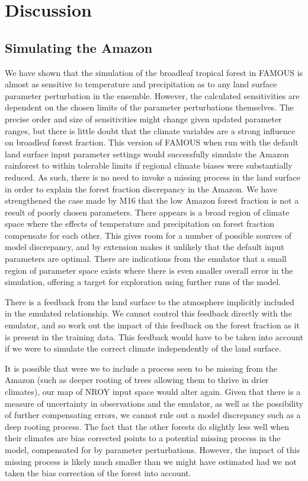 \documentclass[gmd, manuscript]{copernicus}
\begin{document}
\section{Discussion}\label{sec:discussion}
\subsection{Simulating the Amazon}\label{ssec:simulating}
We have shown that the simulation of the broadleaf tropical forest in FAMOUS is almost as sensitive to temperature and precipitation as to any land surface parameter perturbation in the ensemble. However, the calculated sensitivities are dependent on the chosen limits of the parameter perturbations themselves. The precise order and size of sensitivities might change given updated parameter ranges, but there is little doubt that the climate variables are a strong influence on broadleaf forest fraction. This version of FAMOUS when run with the default land surface input parameter settings would successfully simulate the Amazon rainforest to within tolerable limits if regional climate biases were substantially reduced. As such, there is no need to invoke a missing process in the land surface in order to explain the forest fraction discrepancy in the Amazon. We have strengthened the case made by M16 that the low Amazon forest fraction is not a result of poorly chosen parameters.  There appears is a broad region of climate space where the effects of temperature and precipitation on forest fraction compensate for each other. This gives room for a number of possible sources of model discrepancy, and by extension makes it unlikely that the default input parameters are optimal. There are indications from the emulator that a small region of parameter space exists where there is even smaller overall error in the simulation, offering a target for exploration using further runs of the model.
 
There is a feedback from the land surface to the atmosphere implicitly included in the emulated relationship. We cannot control this feedback directly with the emulator, and so work out the impact of this feedback on the forest fraction as it is present in the training data. This feedback would have to be taken into account if we were to simulate the correct climate independently of the land surface.

It is possible that were we to include a process seen to be missing from the Amazon (such as deeper rooting of trees allowing them to thrive in drier climates), our map of NROY input space would alter again. Given that there is a measure of uncertainty in observations and the emulator, as well as the possibility of further compensating errors, we cannot rule out a model discrepancy such as a deep rooting process. The fact that the other forests do slightly less well when their climates are bias corrected points to a potential missing process in the model, compensated for by parameter perturbations. However, the impact of this missing process is likely much smaller than we might have estimated had we not taken the bias correction of the forest into account.
\end{document}
